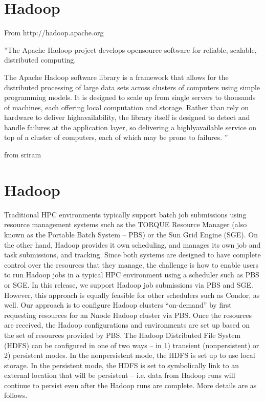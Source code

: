 \section{Hadoop}



From http://hadoop.apache.org

''The Apache Hadoop project develops opensource software for reliable, scalable, distributed computing.

The Apache Hadoop software library is a framework that allows for the distributed processing of large data sets across clusters of computers using simple programming models. It is designed to scale up from single servers to thousands of machines, each offering local computation and storage. Rather than rely on hardware to deliver highavailability, the library itself is designed to detect and handle failures at the application layer, so delivering a highlyavailable service on top of a cluster of computers, each of which may be prone to failures.
'' \cite{www/hadoop}

from sriram \cite{report/myhadoop}

\section{Hadoop}

Traditional HPC environments typically support batch job submissions using resource
management systems such as the TORQUE Resource Manager (also known as the
Portable Batch System – PBS) or the Sun Grid Engine (SGE). On the other hand, Hadoop
provides it own scheduling, and manages its own job and task submissions, and tracking.
Since both systems are designed to have complete control over the resources that they
manage, the challenge is how to enable users to run Hadoop jobs in a typical HPC
environment using a scheduler such as PBS or SGE. In this release, we support Hadoop
job submissions via PBS and SGE. However, this approach is equally feasible for other
schedulers such as Condor, as well.
Our approach is to configure Hadoop clusters “on-demand” by first requesting resources
for an Nnode Hadoop cluster via PBS. Once the resources are received, the Hadoop
configurations and environments are set up based on the set of resources provided by
PBS. The Hadoop Distributed File System (HDFS) can be configured in one of two ways
– in 1) transient (nonpersistent) or 2) persistent modes. In the nonpersistent mode, the
HDFS is set up to use local storage. In the persistent mode, the HDFS is set to
symbolically link to an external location that will be persistent – i.e. data from Hadoop
runs will continue to persist even after the Hadoop runs are complete. More details are as
follows.

